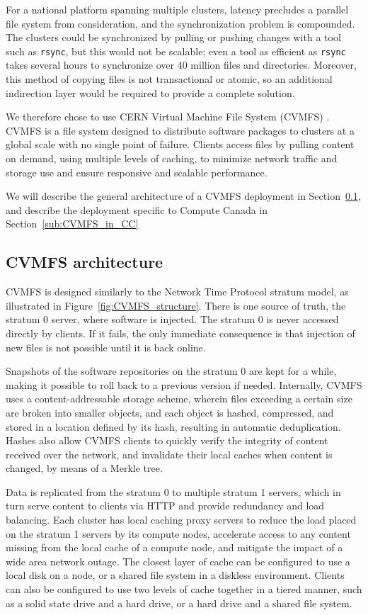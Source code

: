 \documentclass[sigconf]{acmart}
\begin{document}
For a national platform spanning multiple clusters, latency precludes a parallel file system from consideration, and the synchronization problem is compounded. The clusters could be synchronized by pulling or pushing changes with a tool such as \texttt{rsync}, but this would not be scalable; even a tool as efficient as \texttt{rsync} takes several hours to synchronize over 40 million files and directories. Moreover, this method of copying files is not transactional or atomic, so an additional indirection layer would be required to provide a complete solution.

We therefore chose to use CERN Virtual Machine File System (CVMFS) \cite{CVMFS,CVMFS2012}. CVMFS is a file system designed to distribute software packages to clusters at a global scale with no single point of failure. Clients access files by pulling content on demand, using multiple levels of caching, to minimize network traffic and storage use and ensure responsive and scalable performance.

We will describe the general architecture of a CVMFS deployment in Section~\ref{sub:CVMFS_structure}, and describe the deployment specific to Compute Canada in Section~\ref{sub:CVMFS_in_CC}

\subsection{CVMFS architecture}
\label{sub:CVMFS_structure}
CVMFS is designed similarly to the Network Time Protocol stratum model, as illustrated in Figure~\ref{fig:CVMFS_structure}. There is one source of truth, the stratum 0 server, where software is injected.  The stratum 0 is never accessed directly by clients. If it fails, the only immediate consequence is that injection of new files is not possible until it is back online. 

Snapshots of the software repositories on the stratum 0 are kept for a while, making it possible to roll back to a previous version if needed. Internally, CVMFS uses a content-addressable storage scheme, wherein files exceeding a certain size are broken into smaller objects, and each object is hashed, compressed, and stored in a location defined by its hash, resulting in automatic deduplication. Hashes also allow CVMFS clients to quickly verify the integrity of content received over the network, and invalidate their local caches when content is changed, by means of a Merkle tree.

Data is replicated from the stratum 0 to multiple stratum 1 servers, which in turn serve content to clients via HTTP and provide redundancy and load balancing. Each cluster has local caching proxy servers to reduce the load placed on the stratum 1 servers by its compute nodes, accelerate access to any content missing from the local cache of a compute node, and mitigate the impact of a wide area network outage. The closest layer of cache can be configured to use a local disk on a node, or a shared file system in a diskless environment. Clients can also be configured to use two levels of cache together in a tiered manner, such as a solid state drive and a hard drive, or a hard drive and a shared file system.
\end{document}
